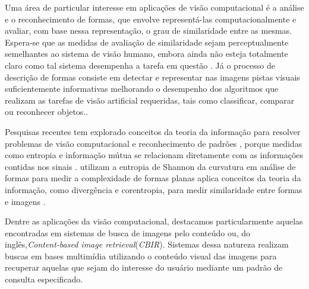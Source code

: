 
Uma área de particular interesse em aplicações de visão computacional é a análise e o reconhecimento de formas, que envolve representá-las computacionalmente e avaliar, com base nessa representação, o grau de similaridade entre as mesmas. Espera-se que as medidas de avaliação de similaridade sejam perceptualmente semelhantes ao sistema de visão humano, embora ainda não esteja totalmente claro como tal sistema desempenha a tarefa em questão \cite{4815272}. Já o processo de descrição de formas consiste em detectar e representar nas imagens pistas visuais suficientemente informativas melhorando o desempenho dos algoritmos que realizam as tarefas de visão artificial requeridas, tais como classificar, comparar ou reconhecer objetos.\cite{Escolano:2009}.

Pesquisas recentes tem explorado conceitos da teoria da informação para resolver problemas de visão computacional e reconhecimento de padrões \cite{Escolano:2009}, porque medidas como entropia e informação mútua se relacionam diretamente com as informações contidas nos sinais \cite{Principe:2011}.  utilizam a entropia de Shannon da curvatura em análise de formas para medir a complexidade de formas planas  aplica conceitos da teoria da informação, como divergência e corentropia, para medir similaridade entre formas e imagens \cite{Principe:2014,Zang:2014}.



Dentre as aplicações da visão computacional, destacamos particularmente aquelas encontradas em sistemas de busca de imagens pelo conteúdo ou, do inglês,\foreignlanguage{english}{\emph{Content-based image retrieval}}(\emph{CBIR}). Sistemas dessa natureza realizam buscas em bases multimídia utilizando o conteúdo visual das imagens para recuperar aquelas que sejam do interesse do usuário mediante um padrão de consulta especificado. 

